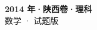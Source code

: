 \documentclass[zihao=-4, a4paper]{ctexart}
\begin{document}
\begin{center}
  {\Large\bfseries 2014 年·陕西卷·理科}\\[4pt]
  {\large 数学 · 试题版}
\end{center}
\medskip
{}

\end{document}
